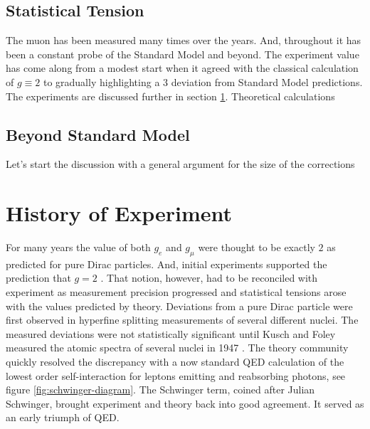 \subsection{Statistical Tension}

The muon \gmtwo has been measured many times over the years.  And, throughout it has been a constant probe of the Standard Model and beyond.  The experiment value has come along from a modest start when it agreed with the classical calculation of $g\equiv2$ to gradually highlighting a \SI{3}{\sigma} deviation from Standard Model predictions.  The experiments are discussed further in section \ref{sec:history-expt}.  Theoretical calculations 


\subsection{Beyond Standard Model}

Let's start the discussion with a general argument for the size of the corrections


\section{History of Experiment} \label{sec:history-expt}

For many years the value of both $g_e$ and $g_\mu$ were thought to be exactly $2$ as predicted for pure Dirac particles\cite{the-muon-g-2}. And, initial experiments supported the prediction that $g = 2$ . That notion, however, had to be reconciled with experiment as measurement precision progressed and statistical tensions arose with the values predicted by theory.  Deviations from a pure Dirac particle were first observed in hyperfine splitting measurements of several different nuclei.  The measured deviations were not statistically significant until Kusch and Foley measured the atomic spectra of several nuclei in 1947 \cite{kusch-foley}.  The theory community quickly resolved the discrepancy with a now standard QED calculation of the lowest order self-interaction for leptons emitting and reabsorbing photons, see figure \ref{fig:schwinger-diagram}.  The Schwinger term, coined after Julian Schwinger, brought experiment and theory back into good agreement.  It served as an early triumph of QED. 

